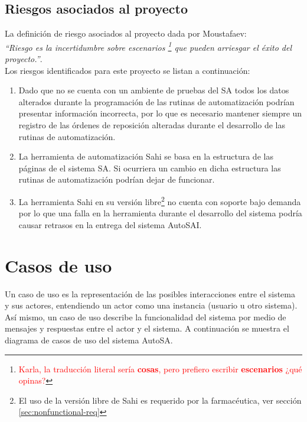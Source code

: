 \subsection{Riesgos asociados al proyecto}
La definición de riesgo asociados al proyecto dada por Moustafaev:\\
\textit{``Riesgo es la incertidumbre sobre escenarios \footnote{\textcolor{red}{Karla, la traducción literal sería \textbf{cosas}, pero prefiero escribir \textbf{escenarios} ¿qué opinas?}} que pueden arriesgar el éxito del proyecto.''}\cite{ScopeManagement}.\\
Los riesgos identificados para este proyecto se listan a continuación:
\begin{enumerate}
  \item Dado que no se cuenta con un ambiente de pruebas del SA todos los datos alterados durante la programación de las rutinas de automatización podrían presentar información incorrecta, por lo que es necesario mantener siempre un registro de las órdenes de reposición alteradas durante el desarrollo de las rutinas de automatización.
  \item La herramienta de automatización Sahi se basa en la estructura de las páginas de el sistema SA. Si ocurriera un cambio en dicha estructura las rutinas de automatización podrían dejar de funcionar.
  \item La herramienta Sahi en su versión libre\footnote{El uso de la versión libre de Sahi es requerido por la farmacéutica, ver sección \ref{sec:nonfunctional-req}} no cuenta con soporte bajo demanda por lo que una falla en la herramienta durante el desarrollo del sistema podría causar retrasos en la entrega del sistema AutoSAI.
\end{enumerate}




\section{Casos de uso}
Un caso de uso es la representación de las posibles interacciones entre el sistema y sus actores, entendiendo un actor como una instancia (usuario u otro sistema). Así mismo, un caso de uso describe la funcionalidad del sistema por medio de mensajes y respuestas entre el actor y el sistema\cite{ApressSE}. A continuación se muestra el diagrama de casos de uso del sistema AutoSA.


